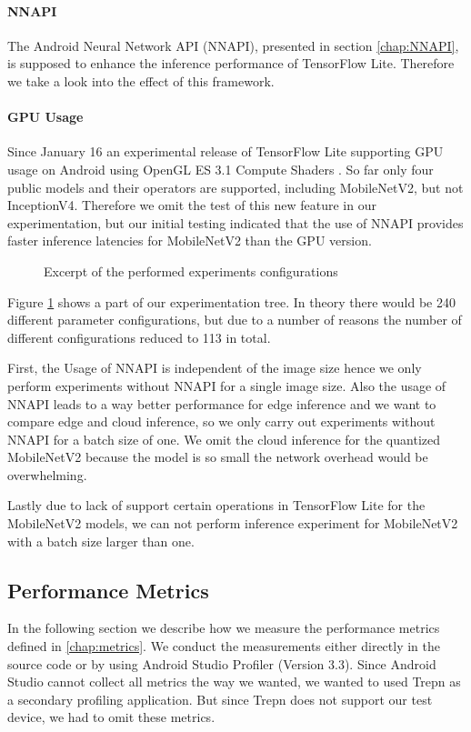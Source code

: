 \paragraph{NNAPI}
The Android Neural Network API (NNAPI), presented in section \ref{chap:NNAPI}, is supposed to enhance the inference performance of TensorFlow Lite. Therefore we take a look into the effect of this framework.
\paragraph{GPU Usage}
Since January 16 an experimental release of TensorFlow Lite supporting GPU usage on Android using OpenGL ES 3.1 Compute Shaders \cite{tfLiteGPU}.
So far only four public models and their operators are supported, including MobileNetV2, but not InceptionV4. 
Therefore we omit the test of this new feature in our experimentation, but our initial testing indicated that the use of NNAPI provides faster inference latencies for MobileNetV2 than the GPU version.


\begin{figure}[H]
\centering
 \scalebox{.7}{}

\caption{Excerpt of the performed experiments configurations}
\label{fig:tree}
\end{figure}
Figure \ref{fig:tree} shows a part of our experimentation tree. In theory there would be 240 different parameter configurations, but due to a number of reasons the number of different configurations reduced to 113 in total.

First, the Usage of NNAPI is independent of the image size hence we only perform experiments without NNAPI for a single image size. Also the usage of NNAPI leads to a way better performance for edge inference and we want to compare edge and cloud inference, so we only carry out experiments without NNAPI for a batch size of one.
We omit the cloud inference for the quantized MobileNetV2 because the model is so small the network overhead would be overwhelming.%

Lastly due to lack of support certain operations in TensorFlow Lite for the MobileNetV2 models, we can not perform inference experiment for MobileNetV2 with a batch size larger than one.
\subsection{Performance Metrics}
\label{chap:insta_measurements}
In the following section we describe how we measure the performance metrics defined in \ref{chap:metrics}.
We conduct the measurements either directly in the source code or by using Android Studio Profiler (Version 3.3). Since Android Studio cannot collect all metrics the way we wanted, we wanted to used Trepn as a secondary profiling application. But since Trepn does not support our test device, we had to omit these metrics.

